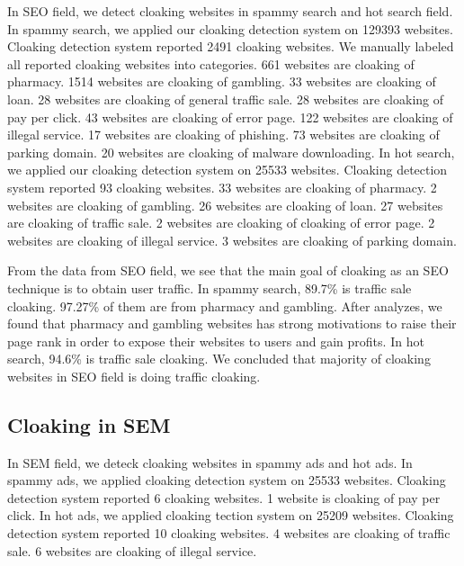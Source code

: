 In SEO field, we detect cloaking websites in spammy search and hot search field. In spammy search,
we applied our cloaking detection system on 129393 websites. Cloaking detection system reported 2491
cloaking websites. We manually labeled all reported cloaking websites into categories.
661 websites are cloaking of pharmacy. 1514 websites are cloaking of gambling.
33 websites are cloaking of loan. 28 websites are cloaking of general traffic sale. 28 websites are cloaking
of pay per click. 43 websites are cloaking of error page. 122 websites are cloaking of illegal service. 
17 websites are cloaking of phishing. 73 websites are cloaking of parking domain. 20 websites are cloaking of malware downloading.
In hot search, we applied our cloaking detection system on 25533 websites. Cloaking detection system reported 93
cloaking websites. 33 websites are cloaking of pharmacy. 2 websites are cloaking of gambling.
26 websites are cloaking of loan. 27 websites are cloaking of traffic sale. 2 websites are cloaking of cloaking of
error page. 2 websites are cloaking of illegal service. 3 websites are cloaking of parking domain.

From the data from SEO field, we see that the main goal of cloaking as an SEO technique is to obtain user traffic.
In spammy search, 89.7\% is traffic sale cloaking. 97.27\% of them are from pharmacy and gambling. After analyzes, we found that
pharmacy and gambling websites has strong motivations to raise their page rank in order to expose their websites to users and gain
profits. In hot search, 94.6\% is traffic sale cloaking. We concluded that majority of cloaking websites in SEO field is doing traffic cloaking.


%
%
%


\subsection{Cloaking in SEM}

In SEM field, we deteck cloaking websites in spammy ads and hot ads. In spammy ads,
we applied cloaking detection system on 25533 websites. Cloaking detection system reported 6 cloaking websites.
1 website is cloaking of pay per click. In hot ads, we applied cloaking tection system on 25209 websites.
Cloaking detection system reported 10 cloaking websites. 4 websites are cloaking of traffic sale.
6 websites are cloaking of illegal service. 

